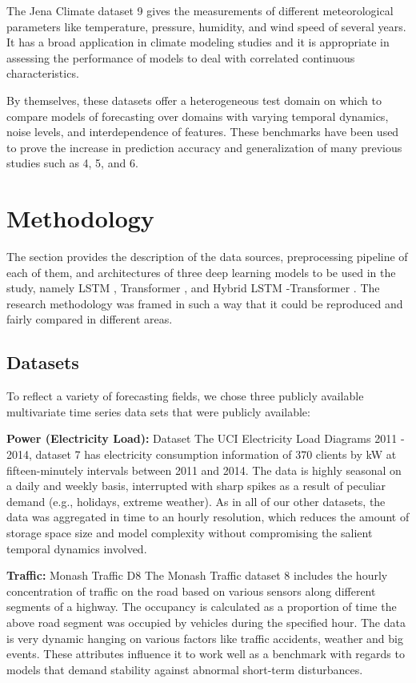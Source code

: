 \documentclass[conference]{IEEEtran}
\begin{document}
The Jena Climate \cite{jena} dataset 9 gives the measurements of different meteorological parameters like temperature, pressure, humidity, and wind speed of several years. It has a broad application in climate modeling studies and it is appropriate in assessing the performance of models to deal with correlated continuous characteristics.

By themselves, these datasets offer a heterogeneous test domain on which to compare models of forecasting over domains with varying temporal dynamics, noise levels, and interdependence of features. These benchmarks have been used to prove the increase in prediction accuracy and generalization of many previous studies such as 4, 5, and 6.

\section{Methodology}
The section provides the description of the data sources, preprocessing pipeline of each of them, and architectures of three deep learning models to be used in the study, namely LSTM \cite{hochreiter1997lstm}, Transformer \cite{vaswani2017attention}, and Hybrid \cite{wu2020deep} LSTM \cite{hochreiter1997lstm}-Transformer \cite{vaswani2017attention}. The research methodology was framed in such a way that it could be reproduced and fairly compared in different areas.
\subsection{Datasets}
To reflect a variety of forecasting fields, we chose three publicly available multivariate time series data sets that were publicly available:

\textbf{Power (Electricity Load):} Dataset The UCI \cite{uci2011power} Electricity Load Diagrams 2011 - 2014, dataset 7 has electricity consumption information of 370 clients by kW at fifteen-minutely intervals between 2011 and 2014. The data is highly seasonal on a daily and weekly basis, interrupted with sharp spikes as a result of peculiar demand (e.g., holidays, extreme weather). As in all of our other datasets, the data was aggregated in time to an hourly resolution, which reduces the amount of storage space size and model complexity without compromising the salient temporal dynamics involved.

\textbf{Traffic:} Monash \cite{godahewa2021monash} Traffic D8 The Monash \cite{godahewa2021monash} Traffic dataset \cite{godahewa2021monash} 8 includes the hourly concentration of traffic on the road based on various sensors along different segments of a highway. The occupancy is calculated as a proportion of time the above road segment was occupied by vehicles during the specified hour. The data is very dynamic hanging on various factors like traffic accidents, weather and big events. These attributes influence it to work well as a benchmark with regards to models that demand stability against abnormal short-term disturbances.  
\end{document}
